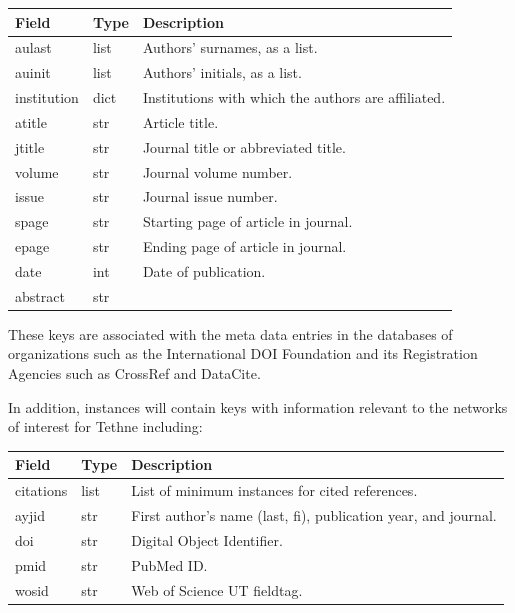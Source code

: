 \documentclass[letterpaper,10pt,english]{sphinxmanual}
\begin{document}
\begin{tabulary}{\linewidth}{|L|L|L|}
\hline
\textbf{
Field
} & \textbf{
Type
} & \textbf{
Description
}\\\hline

aulast
 & 
list
 & 
Authors' surnames, as a list.
\\\hline

auinit
 & 
list
 & 
Authors' initials, as a list.
\\\hline

institution
 & 
dict
 & 
Institutions with which the authors are affiliated.
\\\hline

atitle
 & 
str
 & 
Article title.
\\\hline

jtitle
 & 
str
 & 
Journal title or abbreviated title.
\\\hline

volume
 & 
str
 & 
Journal volume number.
\\\hline

issue
 & 
str
 & 
Journal issue number.
\\\hline

spage
 & 
str
 & 
Starting page of article in journal.
\\\hline

epage
 & 
str
 & 
Ending page of article in journal.
\\\hline

date
 & 
int
 & 
Date of publication.
\\\hline

abstract
 & 
str
 & \\\hline
\end{tabulary}


These keys are associated with the meta data entries in the databases of
organizations such as the International DOI Foundation and its Registration
Agencies such as CrossRef and DataCite.

In addition, {\hyperref[tethne:tethne.data.Paper]{}} instances will contain keys with information
relevant to the networks of interest for Tethne including:

\begin{tabulary}{\linewidth}{|L|L|L|}
\hline
\textbf{
Field
} & \textbf{
Type
} & \textbf{
Description
}\\\hline

citations
 & 
list
 & 
List of minimum {\hyperref[tethne:tethne.data.Paper]{}} instances for cited
references.
\\\hline

ayjid
 & 
str
 & 
First author's name (last, fi), publication year, and
journal.
\\\hline

doi
 & 
str
 & 
Digital Object Identifier.
\\\hline

pmid
 & 
str
 & 
PubMed ID.
\\\hline

wosid
 & 
str
 & 
Web of Science UT fieldtag.
\\\hline
\end{tabulary}
\end{document}

